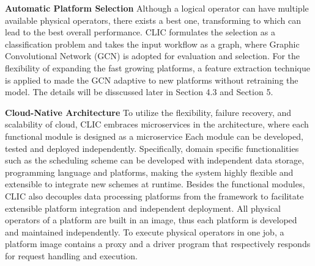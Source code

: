 
\textbf{Automatic Platform Selection} 
Although a logical operator can have multiple available physical operators, there exists a best one, transforming to which can lead to the best overall performance. 
CLIC formulates the selection as a classification problem and takes the input workflow as a graph, 
where Graphic Convolutional Network (GCN) is adopted for evaluation and selection. 
For the flexibility of expanding the fast growing platforms, a feature extraction technique is applied to made the GCN adaptive to new platforms without retraining the model.
The details will be disscussed later in Section 4.3 and Section 5.

\textbf{Cloud-Native Architecture} 
To utilize the flexibility, failure recovery, and scalability of cloud, CLIC embraces microservices in the architecture, where each functional module is designed as a microservice %
Each module can be developed, tested and deployed independently.
Specifically, domain specific functionalities such as the scheduling scheme can be developed with independent data storage, programming language and platforms, making the system highly flexible and extensible to integrate new schemes at runtime.
Besides the functional modules, CLIC also decouples data processing platforms from the framework to facilitate extensible platform integration and independent deployment.
All physical operators of a platform are built in an image, thus each platform is developed and maintained independently.
To execute physical operators in one job, a platform image contains a proxy and a driver program that respectively responds for request handling and execution.

